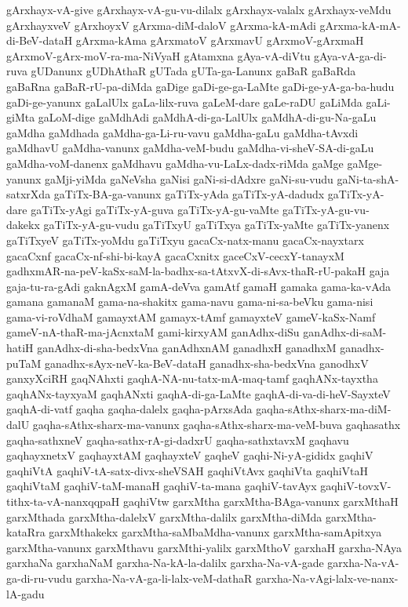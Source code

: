 {gArxhayx-vA-give
gArxhayx-vA-gu-vu-dilalx
gArxhayx-valalx
gArxhayx-veMdu
gArxhayxveV
gArxhoyxV
gArxma-diM-daloV
gArxma-kA-mAdi
gArxma-kA-mA-di-BeV-dataH
gArxma-kAma
gArxmatoV
gArxmavU
gArxmoV-gArxmaH
gArxmoV-gArx-moV-ra-ma-NiVyaH
gAtamxna
gAya-vA-diVtu
gAya-vA-ga-di-ruva
gUDanunx
gUDhAthaR
gUTada
gUTa-ga-Lanunx
gaBaR
gaBaRda
gaBaRna
gaBaR-rU-pa-diMda
gaDige
gaDi-ge-ga-LaMte
gaDi-ge-yA-ga-ba-hudu
gaDi-ge-yanunx
gaLalUlx
gaLa-lilx-ruva
gaLeM-dare
gaLe-raDU
gaLiMda
gaLi-giMta
gaLoM-dige
gaMdhAdi
gaMdhA-di-ga-LalUlx
gaMdhA-di-gu-Na-gaLu
gaMdha
gaMdhada
gaMdha-ga-Li-ru-vavu
gaMdha-gaLu
gaMdha-tAvxdi
gaMdhavU
gaMdha-vanunx
gaMdha-veM-budu
gaMdha-vi-sheV-SA-di-gaLu
gaMdha-voM-danenx
gaMdhavu
gaMdha-vu-LaLx-dadx-riMda
gaMge
gaMge-yanunx
gaMji-yiMda
gaNeVsha
gaNisi
gaNi-si-dAdxre
gaNi-su-vudu
gaNi-ta-shA-satxrXda
gaTiTx-BA-ga-vanunx
gaTiTx-yAda
gaTiTx-yA-dadudx
gaTiTx-yA-dare
gaTiTx-yAgi
gaTiTx-yA-guva
gaTiTx-yA-gu-vaMte
gaTiTx-yA-gu-vu-dakekx
gaTiTx-yA-gu-vudu
gaTiTxyU
gaTiTxya
gaTiTx-yaMte
gaTiTx-yanenx
gaTiTxyeV
gaTiTx-yoMdu
gaTiTxyu
gacaCx-natx-manu
gacaCx-nayxtarx
gacaCxnf
gacaCx-nf-shi-bi-kayA
gacaCxnitx
gaceCxV-cecxY-tanayxM
gadhxmAR-na-peV-kaSx-saM-la-badhx-sa-tAtxvX-di-sAvx-thaR-rU-pakaH
gaja
gaja-tu-ra-gAdi
gaknAgxM
gamA-deVva
gamAtf
gamaH
gamaka
gama-ka-vAda
gamana
gamanaM
gama-na-shakitx
gama-navu
gama-ni-sa-beVku
gama-nisi
gama-vi-roVdhaM
gamayxtAM
gamayx-tAmf
gamayxteV
gameV-kaSx-Namf
gameV-nA-thaR-ma-jAcnxtaM
gami-kirxyAM
ganAdhx-diSu
ganAdhx-di-saM-hatiH
ganAdhx-di-sha-bedxVna
ganAdhxnAM
ganadhxH
ganadhxM
ganadhx-puTaM
ganadhx-sAyx-neV-ka-BeV-dataH
ganadhx-sha-bedxVna
ganodhxV
ganxyXciRH
gaqNAhxti
gaqhA-NA-nu-tatx-mA-maq-tamf
gaqhANx-tayxtha
gaqhANx-tayxyaM
gaqhANxti
gaqhA-di-ga-LaMte
gaqhA-di-va-di-heV-SayxteV
gaqhA-di-vatf
gaqha
gaqha-dalelx
gaqha-pArxsAda
gaqha-sAthx-sharx-ma-diM-dalU
gaqha-sAthx-sharx-ma-vanunx
gaqha-sAthx-sharx-ma-veM-buva
gaqhasathx
gaqha-sathxneV
gaqha-sathx-rA-gi-dadxrU
gaqha-sathxtavxM
gaqhavu
gaqhayxnetxV
gaqhayxtAM
gaqhayxteV
gaqheV
gaqhi-Ni-yA-gididx
gaqhiV
gaqhiVtA
gaqhiV-tA-satx-divx-sheVSAH
gaqhiVtAvx
gaqhiVta
gaqhiVtaH
gaqhiVtaM
gaqhiV-taM-manaH
gaqhiV-ta-mana
gaqhiV-tavAyx
gaqhiV-tovxV-tithx-ta-vA-nanxqqpaH
gaqhiVtw
garxMtha
garxMtha-BAga-vanunx
garxMthaH
garxMthada
garxMtha-dalelxV
garxMtha-dalilx
garxMtha-diMda
garxMtha-kataRra
garxMthakekx
garxMtha-saMbaMdha-vanunx
garxMtha-samApitxya
garxMtha-vanunx
garxMthavu
garxMthi-yalilx
garxMthoV
garxhaH
garxha-NAya
garxhaNa
garxhaNaM
garxha-Na-kA-la-dalilx
garxha-Na-vA-gade
garxha-Na-vA-ga-di-ru-vudu
garxha-Na-vA-ga-li-lalx-veM-dathaR
garxha-Na-vAgi-lalx-ve-nanx-lA-gadu
}
